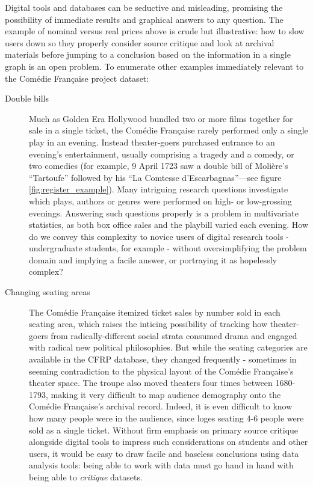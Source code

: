 \documentclass[	DIV=calc,%
							paper=a4,%
							fontsize=11pt,%
							twocolumn]{scrartcl}	 					%
\begin{document}
Digital tools and databases can be seductive and misleading, promising the possibility of immediate results and graphical answers to any question.  The example of nominal versus real prices above is crude but illustrative: how to slow users down so they properly consider source critique and look at archival materials before jumping to a conclusion based on the information in a single graph is an open problem.  To enumerate other examples immediately relevant to the Comédie Française project dataset:

\begin{description}
	\item[Double bills] Much as Golden Era Hollywood bundled two or more films together for sale in a single ticket, the Comédie Française rarely performed only a single play in an evening.  Instead theater-goers purchased entrance to an evening's entertainment, usually comprising a tragedy and a comedy, or two comedies (for example, 9 April 1723 saw a double bill of Molière's ``Tartoufe'' followed by his ``La Comtesse d'Escarbagnas''---see figure \ref{fig:register_example}).  Many intriguing research questions investigate which plays, authors or genres were performed on high- or low-grossing evenings.  Answering such questions properly is a problem in multivariate statistics, as both box office sales and the playbill varied each evening.  How do we convey this complexity to novice users of digital research tools - undergraduate students, for example - without oversimplifying the problem domain and implying a facile answer, or portraying it as hopelessly complex?

	\item[Changing seating areas] The Comédie Française itemized ticket sales by number sold in each seating area, which raises the inticing possibility of tracking how theater-goers from radically-different social strata consumed drama and engaged with radical new political philosophies.  But while the seating categories are available in the CFRP database, they changed frequently - sometimes in seeming contradiction to the physical layout of the Comédie Française's theater space.  The troupe also moved theaters four times between 1680-1793, making it very difficult to map audience demography onto the Comédie Française's archival record.  Indeed, it is even difficult to know how many people were in the audience, since loges seating 4-6 people were sold as a single ticket.  Without firm emphasis on primary source critique alongside digital tools to impress such considerations on students and other users, it would be easy to draw facile and baseless conclusions using data analysis tools: being able to work with data must go hand in hand with being able to \emph{critique} datasets.


\end{description}
\end{document}
